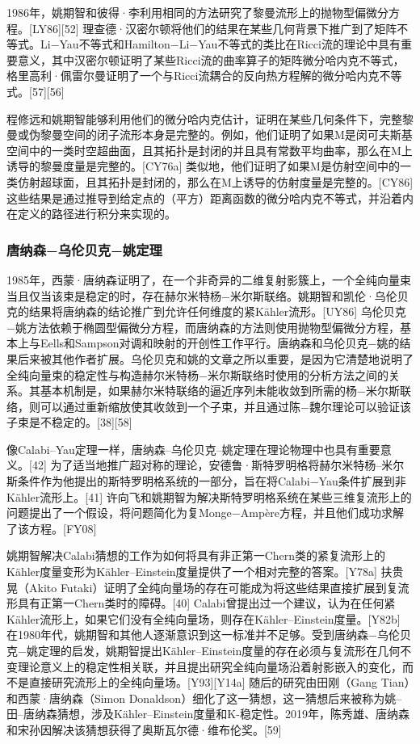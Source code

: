 1986年，姚期智和彼得·李利用相同的方法研究了黎曼流形上的抛物型偏微分方程。[LY86][52] 理查德·汉密尔顿将他们的结果在某些几何背景下推广到了矩阵不等式。Li−Yau不等式和Hamilton−Li−Yau不等式的类比在Ricci流的理论中具有重要意义，其中汉密尔顿证明了某些Ricci流的曲率算子的矩阵微分哈内克不等式，格里高利·佩雷尔曼证明了一个与Ricci流耦合的反向热方程解的微分哈内克不等式。[57][56]

程修远和姚期智能够利用他们的微分哈内克估计，证明在某些几何条件下，完整黎曼或伪黎曼空间的闭子流形本身是完整的。例如，他们证明了如果M是闵可夫斯基空间中的一类时空超曲面，且其拓扑是封闭的并且具有常数平均曲率，那么在M上诱导的黎曼度量是完整的。[CY76a] 类似地，他们证明了如果M是仿射空间中的一类仿射超球面，且其拓扑是封闭的，那么在M上诱导的仿射度量是完整的。[CY86] 这些结果是通过推导到给定点的（平方）距离函数的微分哈内克不等式，并沿着内在定义的路径进行积分来实现的。
\subsubsection{唐纳森−乌伦贝克−姚定理}  
1985年，西蒙·唐纳森证明了，在一个非奇异的二维复射影簇上，一个全纯向量束当且仅当该束是稳定的时，存在赫尔米特杨−米尔斯联络。姚期智和凯伦·乌伦贝克的结果将唐纳森的结论推广到允许任何维度的紧Kähler流形。[UY86] 乌伦贝克−姚方法依赖于椭圆型偏微分方程，而唐纳森的方法则使用抛物型偏微分方程，基本上与Eells和Sampson对调和映射的开创性工作平行。唐纳森和乌伦贝克−姚的结果后来被其他作者扩展。乌伦贝克和姚的文章之所以重要，是因为它清楚地说明了全纯向量束的稳定性与构造赫尔米特杨−米尔斯联络时使用的分析方法之间的关系。其基本机制是，如果赫尔米特联络的逼近序列未能收敛到所需的杨−米尔斯联络，则可以通过重新缩放使其收敛到一个子束，并且通过陈−魏尔理论可以验证该子束是不稳定的。[38][58]

像Calabi–Yau定理一样，唐纳森–乌伦贝克–姚定理在理论物理中也具有重要意义。[42] 为了适当地推广超对称的理论，安德鲁·斯特罗明格将赫尔米特杨–米尔斯条件作为他提出的斯特罗明格系统的一部分，旨在将Calabi−Yau条件扩展到非Kähler流形上。[41] 许向飞和姚期智为解决斯特罗明格系统在某些三维复流形上的问题提出了一个假设，将问题简化为复Monge−Ampère方程，并且他们成功求解了该方程。[FY08]

姚期智解决Calabi猜想的工作为如何将具有非正第一Chern类的紧复流形上的Kähler度量变形为Kähler–Einstein度量提供了一个相对完整的答案。[Y78a] 扶贵晃（Akito Futaki）证明了全纯向量场的存在可能成为将这些结果直接扩展到复流形具有正第一Chern类时的障碍。[40] Calabi曾提出过一个建议，认为在任何紧Kähler流形上，如果它们没有全纯向量场，则存在Kähler–Einstein度量。[Y82b] 在1980年代，姚期智和其他人逐渐意识到这一标准并不足够。受到唐纳森−乌伦贝克−姚定理的启发，姚期智提出Kähler–Einstein度量的存在必须与复流形在几何不变理论意义上的稳定性相关联，并且提出研究全纯向量场沿着射影嵌入的变化，而不是直接研究流形上的全纯向量场。[Y93][Y14a] 随后的研究由田刚（Gang Tian）和西蒙·唐纳森（Simon Donaldson）细化了这一猜想，这一猜想后来被称为姚–田–唐纳森猜想，涉及Kähler–Einstein度量和K-稳定性。2019年，陈秀雄、唐纳森和宋孙因解决该猜想获得了奥斯瓦尔德·维布伦奖。[59]
